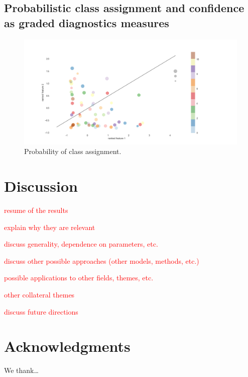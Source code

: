 \documentclass[12pt, a4paper, final, fleqn]{article}
\begin{document}
\subsection{Probabilistic class assignment and confidence as graded diagnostics measures}
\begin{figure}[!htb]
\begin{center}
\includegraphics[width=0.89\columnwidth]{proba_samples_two_features}
  \caption[Probability of class assignment]{Probability of class assignment.
	  \label{fig:probabilistic}}
\end{center}
\end{figure}

\section{Discussion}
\label{discussion}

\textcolor{red}{resume of the results}

\textcolor{red}{explain why they are relevant}

\textcolor{red}{discuss generality, dependence on parameters, etc.}

\textcolor{red}{discuss other possible approaches (other models, methods, etc.)}

\textcolor{red}{possible applications to other fields, themes, etc.}

\textcolor{red}{other collateral themes}

\textcolor{red}{discuss future directions}

\section*{Acknowledgments}

We thank\dots 




\clearpage

\end{document}

